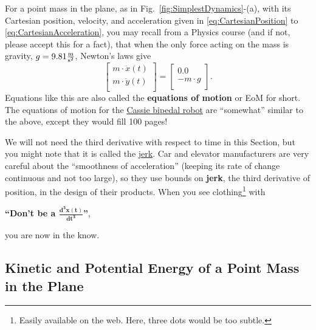 For a point mass in the plane, as in Fig.~\ref{fig:SimplestDynamics}-(a), with its Cartesian position, velocity, and acceleration given in \eqref{eq:CartesianPosition} to \eqref{eq:CartesianAcceleration}, you may recall from a Physics course (and if not, please accept this for a fact), that when the only force acting on the mass is gravity, $g= 9.81 \frac{\rm m}{\rm s^2}$, Newton's laws give
\begin{equation}
 \left[   
 \begin{array}{c}
m \cdot \ddot{x}(t) \\
m \cdot \ddot{y}(t) \\
\end{array}
\right] = \left[
\begin{array}{c}
0.0 \\
- m \cdot g \\
\end{array}
\right].
\end{equation}
Equations like this are also called the \textbf{equations of motion} or EoM for short. The equations of motion for the \href{https://www.youtube.com/playlist?list=PLFe0SMV3hBCBPg0dDG9FbqOy_x7H9kEDJ}{Cassie bipedal robot} are ``somewhat'' similar to the above, except they would fill 100 pages!

We will not need the third derivative with respect to time in this Section, but you might note that it is called the \href{https://en.wikipedia.org/wiki/Jerk_(physics)}{jerk}. Car and elevator manufacturers are very careful about the ``smoothness of acceleration'' (keeping its rate of change continuous and not too large), so they use bounds on  \textbf{jerk}, the third derivative of position, in the design of their products. When you see clothing\footnote{Easily available on the web. Here, three dots would be too subtle.} with \begin{center}
    \textbf{\large ``Don't be a $\bm{\frac{d^3 x(t)}{dt^3}}$''},
\end{center} 
you are now in the know. 

\subsection{Kinetic and Potential Energy of a Point Mass in the Plane}
\label{sec:KineticPotentialEnergyPointMass}


